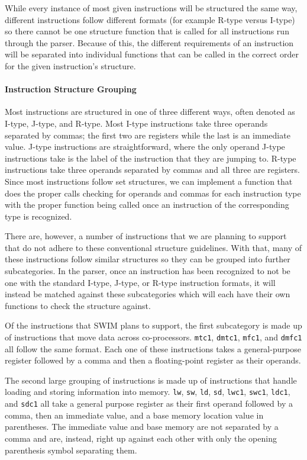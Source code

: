 \documentclass[
    paper=letter,
    parskip=half,
    fontsize=12pt,
    titlepage=firstiscover,
    toc=bibliography,
    numbers=endperiod
]{scrartcl}
\begin{document}
While every instance of most given instructions will be structured the
same way, different instructions follow different formats (for example
R-type versus I-type) so there cannot be one structure function that is
called for all instructions run through the parser. Because of this, the
different requirements of an instruction will be separated into
individual functions that can be called in the correct order for the
given instruction's structure.

\paragraph{Instruction Structure Grouping}

Most instructions are structured in one of three different ways, often
denoted as I-type, J-type, and R-type. Most I-type instructions take
three operands separated by commas; the first two are registers while
the last is an immediate value. J-type instructions are straightforward,
where the only operand J-type instructions take is the label of the
instruction that they are jumping to. R-type instructions take three
operands separated by commas and all three are registers. Since most
instructions follow set structures, we can implement a function that
does the proper calls checking for operands and commas for each
instruction type with the proper function being called once an
instruction of the corresponding type is recognized.

There are, however, a number of instructions that we are planning to
support that do not adhere to these conventional structure guidelines.
With that, many of these instructions follow similar structures so they
can be grouped into further subcategories. In the parser, once an
instruction has been recognized to not be one with the standard I-type,
J-type, or R-type instruction formats, it will instead be matched
against these subcategories which will each have their own functions to
check the structure against.

Of the instructions that SWIM plans to support, the first subcategory is
made up of instructions that move data across co-processors.
\texttt{mtc1}, \texttt{dmtc1}, \texttt{mfc1}, and \texttt{dmfc1} all
follow the same format. Each one of these instructions takes a
general-purpose register followed by a comma and then a floating-point
register as their operands.

The second large grouping of instructions is made up of instructions
that handle loading and storing information into memory. \texttt{lw},
\texttt{sw}, \texttt{ld}, \texttt{sd}, \texttt{lwc1}, \texttt{swc1},
\texttt{ldc1}, and \texttt{sdc1} all take a general purpose register as
their first operand followed by a comma, then an immediate value, and a
base memory location value in parentheses. The immediate value and base
memory are not separated by a comma and are, instead, right up against
each other with only the opening parenthesis symbol separating them.
\end{document}
